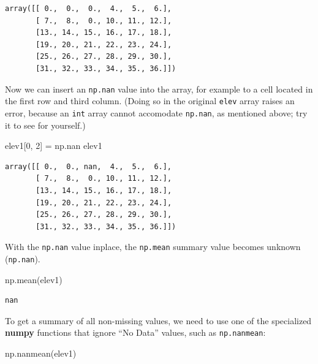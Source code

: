 \documentclass[
  letterpaper,
]{krantz}
\newenvironment{Shaded}{\begin{snugshade}}{\end{snugshade}}
\newcommand{\DecValTok}[1]{\textcolor[rgb]{0.68,0.00,0.00}{#1}}
\newcommand{\NormalTok}[1]{\textcolor[rgb]{0.00,0.23,0.31}{#1}}
\newcommand{\OperatorTok}[1]{\textcolor[rgb]{0.37,0.37,0.37}{#1}}
\begin{document}
\begin{verbatim}
array([[ 0.,  0.,  0.,  4.,  5.,  6.],
       [ 7.,  8.,  0., 10., 11., 12.],
       [13., 14., 15., 16., 17., 18.],
       [19., 20., 21., 22., 23., 24.],
       [25., 26., 27., 28., 29., 30.],
       [31., 32., 33., 34., 35., 36.]])
\end{verbatim}

Now we can insert an \texttt{np.nan} value into the array, for example
to a cell located in the first row and third column. (Doing so in the
original \texttt{elev} array raises an error, because an \texttt{int}
array cannot accomodate \texttt{np.nan}, as mentioned above; try it to
see for yourself.)

\begin{Shaded}
\begin{Highlighting}[]
\NormalTok{elev1[}\DecValTok{0}\NormalTok{, }\DecValTok{2}\NormalTok{] }\OperatorTok{=}\NormalTok{ np.nan}
\NormalTok{elev1}
\end{Highlighting}
\end{Shaded}

\begin{verbatim}
array([[ 0.,  0., nan,  4.,  5.,  6.],
       [ 7.,  8.,  0., 10., 11., 12.],
       [13., 14., 15., 16., 17., 18.],
       [19., 20., 21., 22., 23., 24.],
       [25., 26., 27., 28., 29., 30.],
       [31., 32., 33., 34., 35., 36.]])
\end{verbatim}

With the \texttt{np.nan} value inplace, the \texttt{np.mean} summary
value becomes unknown (\texttt{np.nan}).

\begin{Shaded}
\begin{Highlighting}[]
\NormalTok{np.mean(elev1)}
\end{Highlighting}
\end{Shaded}

\begin{verbatim}
nan
\end{verbatim}

To get a summary of all non-missing values, we need to use one of the
specialized \textbf{numpy} functions that ignore ``No Data'' values,
such as \texttt{np.nanmean}:

\begin{Shaded}
\begin{Highlighting}[]
\NormalTok{np.nanmean(elev1)}
\end{Highlighting}
\end{Shaded}
\end{document}
